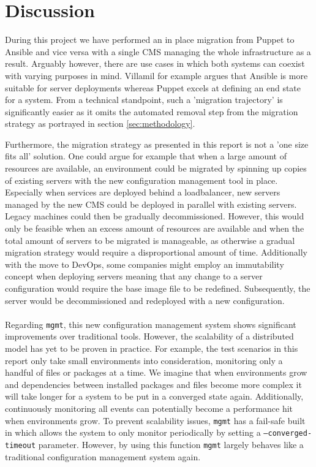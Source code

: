 \section{Discussion}\label{sec:discussion}
During this project we have performed an in place migration from Puppet to Ansible and vice versa with a single CMS managing the whole infrastructure as a result. Arguably however, there are use cases in which both systems can coexist with varying purposes in mind. Villamil \cite{villamil_2014} for example argues that Ansible is more suitable for server deployments whereas Puppet excels at defining an end state for a system. From a technical standpoint, such a 'migration trajectory' is significantly easier as it omits the automated removal step from the migration strategy as portrayed in section \ref{sec:methodology}.

Furthermore, the migration strategy as presented in this report is not a 'one size fits all' solution. One could argue for example that when a large amount of resources are available, an environment could be migrated by spinning up copies of existing servers with the new configuration management tool in place. Especially when services are deployed behind a loadbalancer,  new servers managed by the new CMS could be deployed in parallel with existing servers. Legacy machines could then be gradually decommissioned. However, this would only be feasible when an excess amount of resources are available and when the total amount of servers to be migrated is manageable, as otherwise a gradual migration strategy would require a disproportional amount of time. Additionally with the move to DevOps, some companies might employ an immutability concept when deploying servers meaning that any change to a server configuration would require the base image file to be redefined. Subsequently, the server would be decommissioned and redeployed with a new configuration. 
\\\\
Regarding \texttt{mgmt}, this new configuration management system shows significant improvements over traditional tools. However, the scalability of a distributed model has yet to be proven in practice. For example, the test scenarios in this report only take small environments into consideration, monitoring only a handful of files or packages at a time. We imagine that when environments grow and dependencies between installed packages and files become more complex it will take longer for a system to be put in a converged state again. Additionally, continuously monitoring all events can potentially become a performance hit when environments grow. To prevent scalability issues, \texttt{mgmt} has a fail-safe built in which allows the system to only monitor periodically by setting a \texttt{--converged-timeout} parameter. However, by using this function \texttt{mgmt} largely behaves like a traditional configuration management system again.  

